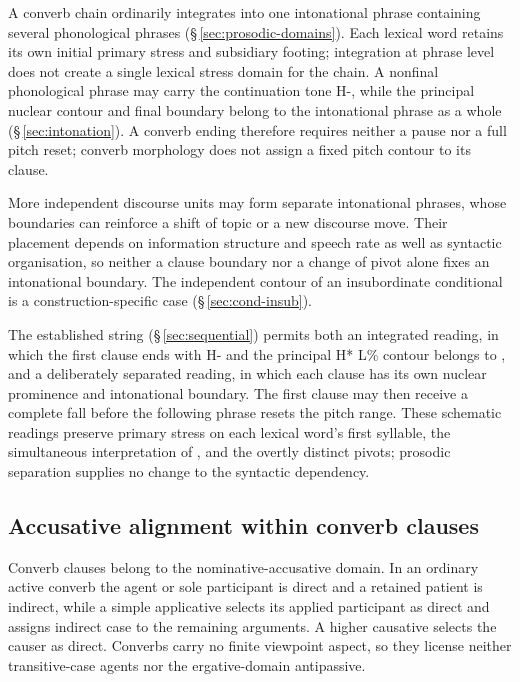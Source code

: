 A converb chain ordinarily integrates into one intonational phrase containing
several phonological phrases (§\,\ref{sec:prosodic-domains}). Each lexical
word retains its own initial primary stress and subsidiary footing; integration
at phrase level does not create a single lexical stress domain for the chain.
A nonfinal phonological phrase may carry the continuation tone H-, while the
principal nuclear contour and final boundary belong to the intonational
phrase as a whole
(§\,\ref{sec:intonation}). A converb ending therefore requires neither a
pause nor a full pitch reset; converb morphology does not assign a fixed
pitch contour to its clause.

More independent discourse units may form separate intonational phrases, whose
boundaries can reinforce a shift of topic or a new discourse move. Their
placement depends on information structure and speech rate as well as syntactic
organisation, so neither a clause boundary nor a change of pivot alone fixes
an intonational boundary. The independent contour of an insubordinate
conditional is a construction-specific case (§\,\ref{sec:cond-insub}).

The established string 
 (§\,\ref{sec:sequential}) permits both an integrated reading, in which
 the first clause ends with H- and the principal H* L\% contour belongs
 to , and a deliberately separated reading, in which each
 clause has its own nuclear prominence and intonational boundary. The first
 clause may then receive a complete fall before the following phrase resets
 the pitch range. These schematic readings preserve primary stress on each
 lexical word's first syllable, the simultaneous interpretation of
 , and the overtly distinct pivots; prosodic separation supplies
 no change to the syntactic dependency.

\subsection{Accusative alignment within converb clauses}

Converb clauses belong to the nominative-accusative domain. In an ordinary
active converb the agent or sole participant is direct and a retained patient
is indirect, while a simple applicative selects its applied participant as
direct and assigns indirect case to the remaining arguments. A higher
causative selects the causer as direct. Converbs carry no finite viewpoint
aspect, so they license neither transitive-case agents nor the
ergative-domain antipassive.

